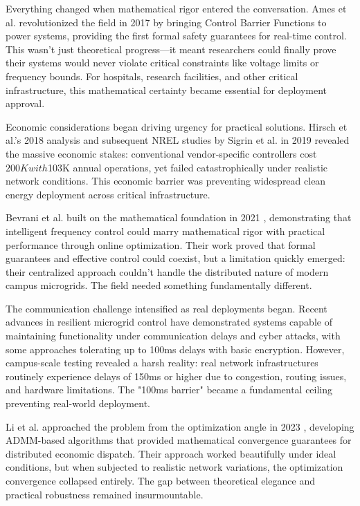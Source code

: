 \documentclass[12pt]{article}
\begin{document}
Everything changed when mathematical rigor entered the conversation. Ames et al. revolutionized the field in 2017 \cite{ames2017} by bringing Control Barrier Functions to power systems, providing the first formal safety guarantees for real-time control. This wasn't just theoretical progress—it meant researchers could finally prove their systems would never violate critical constraints like voltage limits or frequency bounds. For hospitals, research facilities, and other critical infrastructure, this mathematical certainty became essential for deployment approval.

Economic considerations began driving urgency for practical solutions. Hirsch et al.'s 2018 analysis \cite{hirsch2018} and subsequent NREL studies by Sigrin et al. in 2019 \cite{sigrin2019} revealed the massive economic stakes: conventional vendor-specific controllers cost $200K with $103K annual operations, yet failed catastrophically under realistic network conditions. This economic barrier was preventing widespread clean energy deployment across critical infrastructure.

Bevrani et al. built on the mathematical foundation in 2021 \cite{bevrani2021}, demonstrating that intelligent frequency control could marry mathematical rigor with practical performance through online optimization. Their work proved that formal guarantees and effective control could coexist, but a limitation quickly emerged: their centralized approach couldn't handle the distributed nature of modern campus microgrids. The field needed something fundamentally different.

The communication challenge intensified as real deployments began. Recent advances in resilient microgrid control have demonstrated systems capable of maintaining functionality under communication delays and cyber attacks, with some approaches tolerating up to 100ms delays with basic encryption. However, campus-scale testing revealed a harsh reality: real network infrastructures routinely experience delays of 150ms or higher due to congestion, routing issues, and hardware limitations. The "100ms barrier" became a fundamental ceiling preventing real-world deployment.

Li et al. approached the problem from the optimization angle in 2023 \cite{li2023}, developing ADMM-based algorithms that provided mathematical convergence guarantees for distributed economic dispatch. Their approach worked beautifully under ideal conditions, but when subjected to realistic network variations, the optimization convergence collapsed entirely. The gap between theoretical elegance and practical robustness remained insurmountable.
\end{document}
